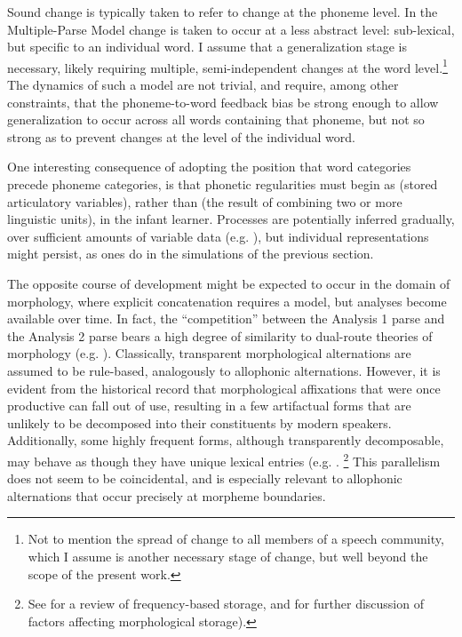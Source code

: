 Sound change is typically taken to refer to change at the phoneme level.
In the Multiple-Parse Model change is taken to occur at a less abstract
level: sub-lexical, but specific to an individual word. I assume that
a generalization stage is necessary, likely requiring multiple, semi-independent
changes at the word level.\footnote{Not to mention the spread of change to all members of a speech community, which I assume is another necessary stage of change, but well beyond the scope of the present work.} The dynamics of such a model are not trivial, and require, among
other constraints, that the phoneme-to-word feedback bias be strong
enough to allow generalization to occur across all words containing
that phoneme, but not so strong as to prevent changes at the level
of the individual word. 

One interesting consequence of adopting the position that word categories
precede phoneme categories, is that phonetic regularities must begin
as  (stored articulatory variables), rather than 
(the result of combining two or more linguistic units), in the infant
learner. Processes are potentially inferred gradually, over sufficient
amounts of variable data (e.g. \citealp{goodman1997inseparability}),
but individual  representations might persist, as 
ones do in the simulations of the previous section. 

The opposite course of development might be expected to occur in the
domain of morphology, where explicit concatenation requires a 
model, but  analyses become available over time. In fact,
the “competition” between the Analysis 1 parse and the Analysis
2 parse bears a high degree of similarity to dual-route theories of
morphology (e.g. \citealt{caramazza1988lexical,frauenfelder1992constraining}).
Classically, transparent morphological alternations are assumed to
be rule-based, analogously to allophonic alternations. However, it
is evident from the historical record that morphological affixations
that were once productive can fall out of use, resulting in a few
artifactual forms that are unlikely to be decomposed into their constituents
by modern speakers. Additionally, some highly frequent forms, although
transparently decomposable, may behave as though they have unique
lexical entries (e.g. \citealt{baayen1997singulars}. \footnote{See \citealt{levelt1999theory}
for a review of frequency-based storage, and \citealt{burani1987representation,baayen1993frequency}
for further discussion of factors affecting morphological storage).}
This parallelism does not seem to be coincidental, and is especially
relevant to allophonic alternations that occur precisely at morpheme
boundaries.

